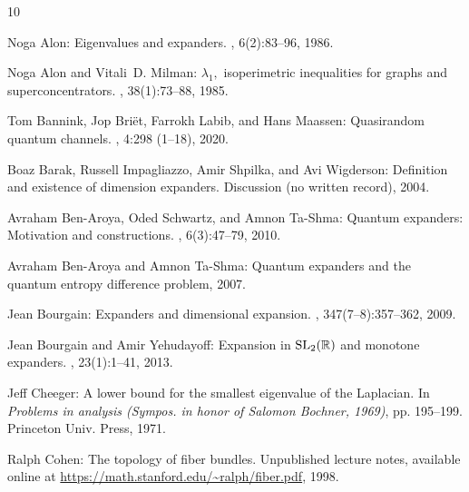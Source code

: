 \documentclass[11pt]{article}
\theoremstyle{plain}
\numberwithin{equation}{section}
\theoremstyle{definition}
\begin{document}
\tocrefpdfbookmark
\begin{thebibliography}{10}

{\sc Noga Alon}: Eigenvalues and expanders.
, 6(2):83--96, 1986.
\newblock [\epfmtdoi{10.1007/BF02579166}]

{\sc Noga Alon and Vitali~D. Milman}: {$\lambda_1,$} isoperimetric inequalities
  for graphs and superconcentrators.
, 38(1):73--88, 1985.
\newblock [\epfmtdoi{10.1016/0095-8956(85)90092-9}]

{\sc Tom Bannink, Jop Bri{\"{e}}t, Farrokh Labib, and Hans Maassen}:
  Quasirandom quantum channels.
, 4:298 (1--18), 2020.
\newblock [\epfmtdoi{10.22331/q-2020-07-16-298}]

{\sc Boaz Barak, Russell Impagliazzo, Amir Shpilka, and Avi Wigderson}:
  Definition and existence of dimension expanders.
\newblock Discussion (no written record), 2004.

{\sc Avraham Ben-Aroya, Oded Schwartz, and Amnon Ta-Shma}: Quantum expanders:
  {M}otivation and constructions.
, 6(3):47--79, 2010.

{\sc Avraham Ben-Aroya and Amnon Ta-Shma}: Quantum expanders and the quantum
  entropy difference problem, 2007.

{\sc Jean Bourgain}: Expanders and dimensional expansion.
, 347(7--8):357--362, 2009.

{\sc Jean Bourgain and Amir Yehudayoff}: Expansion in {${\rm
  SL}_2(\mathbb{R})$} and monotone expanders.
, 23(1):1--41, 2013.
\newblock [\epfmtdoi{10.1007/s00039-012-0200-9}]

{\sc Jeff Cheeger}: A lower bound for the smallest eigenvalue of the
  {L}aplacian.
\newblock In {\em Problems in analysis ({S}ympos. in honor of {S}alomon
  {B}ochner, 1969)}, pp. 195--199. Princeton Univ. Press, 1971.
\newblock [\epfmtdoi{10.1515/9781400869312-013}]

{\sc Ralph Cohen}: The topology of fiber bundles.
\newblock Unpublished lecture notes, available online at
  \url{https://math.stanford.edu/~ralph/fiber.pdf}, 1998.


\end{thebibliography}
\end{document}
